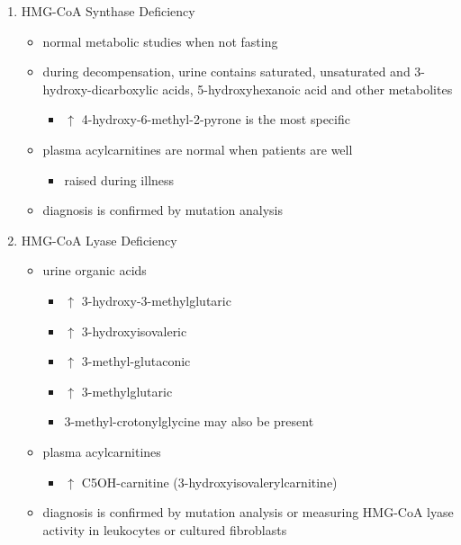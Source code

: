\documentclass{scrartcl}
\begin{document}
\begin{enumerate}
\begin{enumerate}
\item HMG-CoA Synthase Deficiency
\label{sec:org51e32cf}
\begin{itemize}
\item normal metabolic studies when not fasting
\item during decompensation, urine contains saturated, unsaturated and
3-hydroxy-dicarboxylic acids, 5-hydroxyhexanoic acid and other
metabolites
\begin{itemize}
\item \(\uparrow\) 4-hydroxy-6-methyl-2-pyrone is the most specific
\end{itemize}
\item plasma acylcarnitines are normal when patients are well
\begin{itemize}
\item raised during illness
\end{itemize}
\item diagnosis is confirmed by mutation analysis
\end{itemize}

\item HMG-CoA Lyase Deficiency
\label{sec:orgc074076}
\begin{itemize}
\item urine organic acids
\begin{itemize}
\item \(\uparrow\) 3-hydroxy-3-methylglutaric
\item \(\uparrow\) 3-hydroxyisovaleric
\item \(\uparrow\) 3-methyl-glutaconic
\item \(\uparrow\) 3-methylglutaric
\item 3-methyl-crotonylglycine may also be present
\end{itemize}
\item plasma acylcarnitines
\begin{itemize}
\item \(\uparrow\) C5OH-carnitine (3-hydroxyisovalerylcarnitine)
\end{itemize}
\item diagnosis is confirmed by mutation analysis or measuring HMG-CoA
lyase activity in leukocytes or cultured fibroblasts
\end{itemize}
\end{enumerate}


\end{enumerate}
\end{document}
